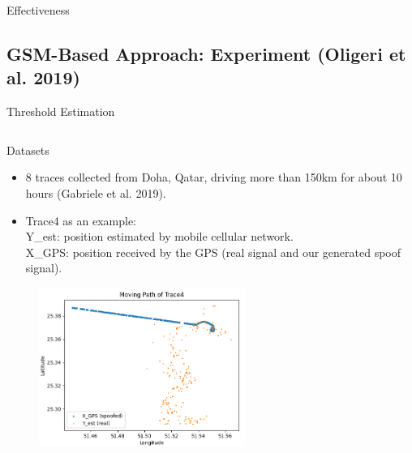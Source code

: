 \documentclass[aspectratio=169, 8pt]{beamer}
\begin{document}
\begin{frame}{Effectiveness}
\end{frame}


\subsection{GSM-Based Approach: Experiment (Oligeri et al. 2019)}




\begin{frame}{Threshold Estimation}

    \begin{columns}
        \begin{column}{0.6\linewidth}
        \begin{block}{Datasets}
            \begin{itemize}
                \item 8 traces collected from Doha, Qatar, driving more than 150km for about 10 hours (Gabriele et al. 2019).
                \item Trace4 as an example:\\
                Y\_est: position estimated by mobile cellular network.\\
                X\_GPS: position received by the GPS (real signal and our generated spoof signal).
            \end{itemize}
        \end{block}
            
            
        \begin{figure}
            \centering
            \includegraphics[width = 0.6\textwidth]{images/trace4.png}
            \label{fig:enter-label}
        \end{figure} 
        \end{column}
        

\end{columns}
\end{frame}
\end{document}
